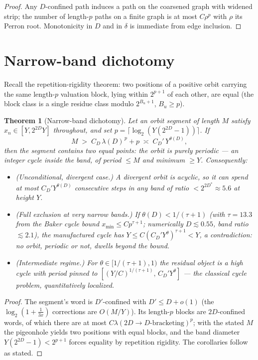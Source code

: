 \documentclass[11pt]{article}
\newtheorem{theorem}{Theorem}
\begin{document}
\begin{proof}
Any $D$-confined path induces a path on the coarsened graph with widened
strip; the number of length-$p$ paths on a finite graph is at most
$C\rho^p$ with $\rho$ its Perron root. Monotonicity in $D$ and in
$\delta$ is immediate from edge inclusion.
\end{proof}

\section{Narrow-band dichotomy}

Recall the repetition-rigidity theorem: two positions of a positive
orbit carrying the same length-$p$ valuation block, lying within
$2^{p+1}$ of each other, are equal (the block class is a single residue
class modulo $2^{B_u+1}$, $B_u\ge p$).

\begin{theorem}[Narrow-band dichotomy]\label{thm:narrowband}
Let an orbit segment of length $M$ satisfy $x_n\in[Y,2^{2D}Y]$
throughout, and set $p=\lceil\log_2(Y(2^{2D}-1))\rceil$. If
\[
M\;>\;C_D\,\lambda(D)^{\,p}+p
\;\asymp\;C_D'\,Y^{\theta(D)},
\]
then the segment contains two equal points: the orbit is purely periodic
--- an integer cycle inside the band, of period $\le M$ and minimum
$\ge Y$. Consequently:
\begin{itemize}
\item[(a)] \emph{(Unconditional, divergent case.)} A divergent orbit is
acyclic, so it can spend at most $C_D'Y^{\theta(D)}$ consecutive steps in
any band of ratio $<2^{2D^*}\approx5.6$ at height $Y$.
\item[(b)] \emph{(Full exclusion at very narrow bands.)} If
$\theta(D)<1/(\tau+1)$ (with $\tau=13.3$ from the Baker cycle bound
$x_{\min}\le Cp^{\tau+1}$; numerically $D\lesssim0.55$, band ratio
$\lesssim2.1$), the manufactured cycle has $Y\le C(C_D'Y^{\theta})^{\tau+1}
<Y$, a contradiction: \emph{no} orbit, periodic or not, dwells beyond the
bound.
\item[(c)] \emph{(Intermediate regime.)} For $\theta\in[1/(\tau+1),1)$
the residual object is a high cycle with period pinned to
$[(Y/C)^{1/(\tau+1)},\,C_D'Y^{\theta}]$ --- the classical cycle problem,
quantitatively localized.
\end{itemize}
\end{theorem}

\begin{proof}
The segment's word is $D'$-confined with $D'\le D+o(1)$ (the
$\log_2(1+\frac1{3x})$ corrections are $O(M/Y)$). Its length-$p$ blocks
are $2D$-confined words, of which there are at most
$C\lambda(2D\to D\text{-bracketing})^p$; with the stated $M$ the
pigeonhole yields two positions with equal blocks, and the band diameter
$Y(2^{2D}-1)<2^{p+1}$ forces equality by repetition rigidity. The
corollaries follow as stated.
\end{proof}
\end{document}
